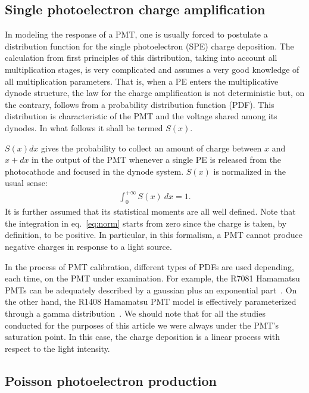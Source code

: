 \documentclass[a4paper,11pt]{article}
\begin{document}
\subsection{Single photoelectron charge amplification}
%

In modeling the response of a PMT, one is usually forced to postulate a distribution function for the single photoelectron (SPE) charge deposition. 
The calculation from first principles of this distribution, taking into account all multiplication stages, is very complicated and assumes a very good knowledge of all multiplication parameters. 
That is, when a PE enters the multiplicative dynode structure, the law for the charge amplification is not deterministic but, on the contrary, follows from a probability distribution function (PDF). 
This distribution is characteristic of the PMT and the voltage shared among its dynodes. In what follows it shall be termed $S(x)$. 

$S(x)dx$ gives the probability to collect an amount of charge between $x$ and $x + dx$ in the output of the PMT whenever a single PE
is released from the photocathode and focused in the dynode system. 
$S(x)$ is normalized in the usual sense:
\begin{align}
\int_{0}^{+\infty} S(x) \ dx = 1. \label{eq:norm}
\end{align}
It is further assumed that its statistical moments are all well defined. 
Note that the integration in eq.~\eqref{eq:norm} starts from zero since the charge is taken, by definition, to be positive. 
In particular, in this formalism, a PMT cannot produce negative charges in response to a light source. 

In the process of PMT calibration, different types of PDFs are used depending, each time, on the PMT under examination.
For example, the R7081 Hamamatsu PMTs can be adequately described by a gaussian plus an exponential part~\cite{DCID1,DCID2,DCID3}. 
On the other hand, the R1408 Hamamatsu PMT model is effectively parameterized through a gamma distribution~\cite{Me}. 
We should note that for all the studies conducted for the purposes of this article we were always under the PMT's saturation point. 
In this case, the charge deposition is a linear process with respect to the light intensity. 


\subsection{Poisson photoelectron production}
%
\end{document}
